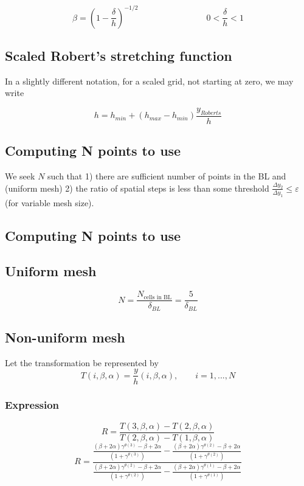 \documentclass[11pt]{article}
\newcommand{\g}{\gamma}
\begin{document}
\begin{equation}
	\beta = \left( 1 - \frac{\delta}{h} \right)^{-1/2}
	\qquad \qquad
	\qquad \qquad
	0 < \frac{\delta}{h} < 1
\end{equation}


\subsection{Scaled Robert's stretching function}
In a slightly different notation, for a scaled grid, not starting at zero, we may write

\begin{equation}
	h = h_{min} + (h_{max}-h_{min}) \frac{y_{Roberts}}{h}
\end{equation}

\subsection{Computing N points to use}
We seek $N$ such that 1) there are sufficient number of points in the BL and (uniform mesh) 2) the ratio of spatial steps is less than some threshold $\frac{\Delta y_2}{\Delta y_1} \le \varepsilon$ (for variable mesh size).

\subsection{Computing N points to use}

\subsection{Uniform mesh}
\begin{equation}
	N = \frac{N_{\text{cells in BL}}}{\delta_{BL}} = \frac{5}{\delta_{BL}}
\end{equation}

\subsection{Non-uniform mesh}

Let the transformation be represented by
\begin{equation} \label{eq:T2}
	T(i,\beta,\alpha) = \frac{y}{h} (i,\beta,\alpha), \qquad i=1,...,N
\end{equation}

\subsubsection{Expression}
\begin{equation}
	R = \frac{T(3,\beta,\alpha)-T(2,\beta,\alpha)}{T(2,\beta,\alpha)-T(1,\beta,\alpha)}
\end{equation}
\begin{equation}
	R =
	\frac{
	\frac{(\beta + 2 \alpha)\g^{\theta(3)}-\beta +2\alpha}{\left(1+\g^{\theta(3)} \right)} - 
	\frac{(\beta + 2 \alpha)\g^{\theta(2)}-\beta +2\alpha}{\left(1+\g^{\theta(2)} \right)}
	}{
	\frac{(\beta + 2 \alpha)\g^{\theta(2)}-\beta +2\alpha}{\left(1+\g^{\theta(2)} \right)} - 
	\frac{(\beta + 2 \alpha)\g^{\theta(1)}-\beta +2\alpha}{\left(1+\g^{\theta(1)} \right)}
	}
\end{equation}
\end{document}
